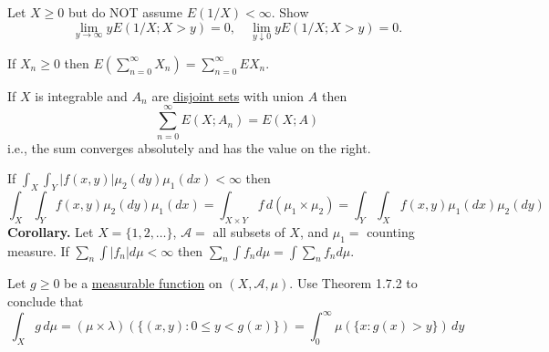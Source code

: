   \begin{exercise}[Durrett 1.6.14]
    Let $X \geq 0$ but do NOT assume $E(1/X) < \infty$. Show
    \begin{equation*}
      \lim_{y \to \infty} y E(1/X; X > y) = 0, \quad \lim_{y \downarrow 0} y E(1/X; X > y) = 0.
    \end{equation*}
  \end{exercise}
  \begin{solution}

  \end{solution}

  \begin{exercise}[Durrett 1.6.15]
    If $X_n \geq 0$ then $E(\sum_{n=0}^{\infty} X_n) = \sum_{n=0}^{\infty} EX_n$.
  \end{exercise}
  \begin{solution}

  \end{solution}

  \begin{exercise}[Durrett 1.6.16]
    If $X$ is integrable and $A_n$ are \hyperref[st-def:disjoint-sets]{disjoint sets} with union $A$ then
    \begin{equation*}
      \sum_{n=0}^{\infty} E(X; A_n) = E(X; A)
    \end{equation*}
    i.e., the sum converges absolutely and has the value on the right.
  \end{exercise}
  \begin{solution}

  \end{solution}

  \begin{exercise}[Durrett 1.7.1]
    If $\int_X \int_Y |f(x, y)| \mu_2(dy) \mu_1(dx) < \infty$ then
    \begin{equation*}
      \int_X \int_Y f(x, y) \mu_2(dy) \mu_1(dx) = \int_{X \times Y} f \, d(\mu_1 \times \mu_2) = \int_Y \int_X f(x, y) \mu_1(dx) \mu_2(dy)
    \end{equation*}
    \textbf{Corollary.} Let $X = \{1, 2, \dots \}$, $\mathcal{A} =$ all subsets of $X$, and $\mu_1 =$ counting measure. If $\sum_n \int |f_n| d\mu < \infty$ then $\sum_n \int f_n d\mu = \int \sum_n f_n d\mu$.
  \end{exercise}
  \begin{solution}

  \end{solution}

  \begin{exercise}[Durrett 1.7.2]
    Let $g \geq 0$ be a \hyperref[mt-def:measurable-function]{measurable function} on $(X, \mathcal{A}, \mu)$. Use Theorem 1.7.2 to conclude that
    \begin{equation*}
      \int_X g \, d\mu = (\mu \times \lambda)(\{(x, y) : 0 \leq y < g(x)\}) = \int_0^{\infty} \mu(\{x : g(x) > y\}) \, dy
    \end{equation*}
  \end{exercise}
  \begin{solution}

  \end{solution}

